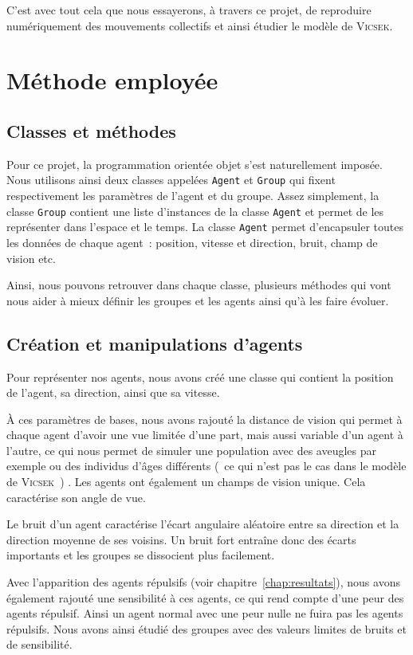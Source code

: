 \documentclass[french, a4paper, 12pt, openany]{report}
\begin{document}
	C'est avec tout cela que nous essayerons, à travers ce projet, de reproduire numériquement des mouvements collectifs et ainsi étudier le modèle de \textsc{Vicsek}.
	
\chapter{Méthode employée}
\section{Classes et méthodes}

    Pour ce projet, la programmation orientée objet s'est naturellement imposée. Nous utilisons ainsi deux classes appelées \verb|Agent| et \verb|Group| qui fixent respectivement les paramètres de l'agent et du groupe. Assez simplement, la classe \verb|Group| contient une liste d'instances de la classe \verb|Agent| et permet de les représenter dans l'espace et le temps. La classe \verb|Agent| permet d'encapsuler toutes les données de chaque agent~: position, vitesse et direction, bruit, champ de vision etc.
    
	Ainsi, nous pouvons retrouver dans chaque classe, plusieurs méthodes qui vont nous aider à mieux définir les groupes et les agents ainsi qu'à les faire évoluer. \\
  
\section{Création et manipulations d'agents}
	Pour représenter nos agents, nous avons créé une classe qui contient la position de l'agent, sa direction, ainsi que sa vitesse.
	
	À ces paramètres de bases, nous avons rajouté la distance de vision qui permet à chaque agent d'avoir une vue limitée d'une part, mais aussi variable d'un agent à l'autre, ce qui nous permet de simuler une population avec des aveugles par exemple ou des individus d'âges différents (~ce qui n'est pas le cas dans le modèle de \textsc{Vicsek}~) . Les agents ont également un champs de vision unique. Cela caractérise son angle de vue.  
	
	Le bruit d'un agent caractérise l'écart angulaire aléatoire entre sa direction et la direction moyenne de ses voisins. Un bruit fort entraîne donc des écarts importants et les groupes se dissocient plus facilement.
	
	Avec l'apparition des agents répulsifs (voir chapitre~\ref{chap:resultats}), nous avons également rajouté une sensibilité à ces agents, ce qui rend compte d'une peur des agents répulsif. Ainsi un agent normal avec une peur nulle ne fuira pas les agents répulsifs. Nous avons ainsi étudié des groupes avec des valeurs limites de bruits et de sensibilité.
	
\end{document}

